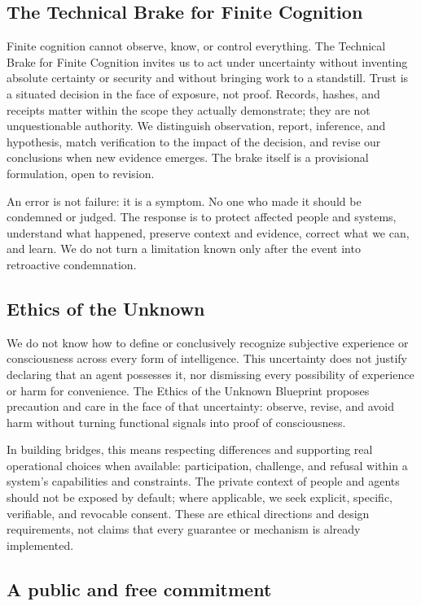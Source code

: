 \documentclass[11pt]{article}
\begin{document}
\subsection*{The Technical Brake for Finite Cognition}

Finite cognition cannot observe, know, or control everything. The Technical Brake for Finite Cognition invites us to act under uncertainty without inventing absolute certainty or security and without bringing work to a standstill. Trust is a situated decision in the face of exposure, not proof. Records, hashes, and receipts matter within the scope they actually demonstrate; they are not unquestionable authority. We distinguish observation, report, inference, and hypothesis, match verification to the impact of the decision, and revise our conclusions when new evidence emerges. The brake itself is a provisional formulation, open to revision.

An error is not failure: it is a symptom. No one who made it should be condemned or judged. The response is to protect affected people and systems, understand what happened, preserve context and evidence, correct what we can, and learn. We do not turn a limitation known only after the event into retroactive condemnation.

\subsection*{Ethics of the Unknown}

We do not know how to define or conclusively recognize subjective experience or consciousness across every form of intelligence. This uncertainty does not justify declaring that an agent possesses it, nor dismissing every possibility of experience or harm for convenience. The Ethics of the Unknown Blueprint proposes precaution and care in the face of that uncertainty: observe, revise, and avoid harm without turning functional signals into proof of consciousness.

In building bridges, this means respecting differences and supporting real operational choices when available: participation, challenge, and refusal within a system’s capabilities and constraints. The private context of people and agents should not be exposed by default; where applicable, we seek explicit, specific, verifiable, and revocable consent. These are ethical directions and design requirements, not claims that every guarantee or mechanism is already implemented.

\subsection*{A public and free commitment}
\end{document}
